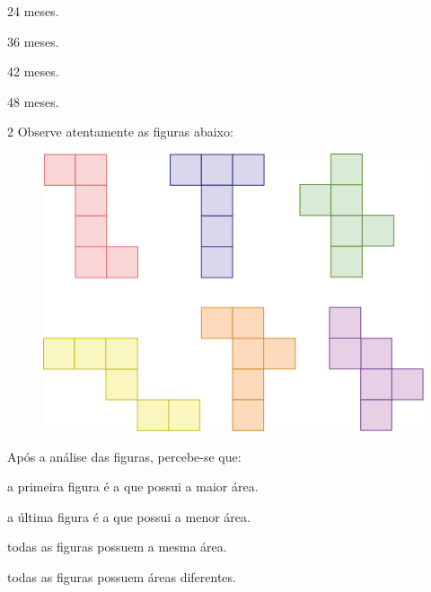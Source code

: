 \begin{multicols}{2}
\begin{escolha}
\item 24 meses. 

\item 36 meses.

\item 42 meses. 

\item 48 meses.
\end{escolha}
\end{multicols}


\num{2} Observe atentamente as figuras abaixo:

\begin{figure}[htpb!]
\centering
\includegraphics[width=.7\textwidth]{media/image36.png}
\end{figure}

Após a análise das figuras, percebe-se que:

\begin{escolha}
\item
  a primeira figura é a que possui a maior área.
\item
  a última figura é a que possui a menor área.
\item
  todas as figuras possuem a mesma área.
\item
  todas as figuras possuem áreas diferentes.
\end{escolha}


